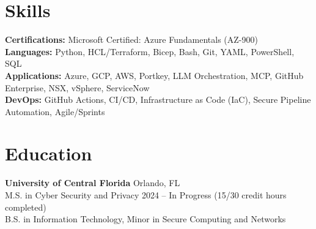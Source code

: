 \documentclass[10pt, letterpaper]{article}
\begin{document}
\section{Skills}
\textbf{Certifications:} Microsoft Certified: Azure Fundamentals (AZ-900) \\
\textbf{Languages:} Python, HCL/Terraform, Bicep, Bash, Git, YAML, PowerShell, SQL \\
\textbf{Applications:} Azure, GCP, AWS, Portkey, LLM Orchestration, MCP, GitHub Enterprise, NSX, vSphere, ServiceNow \\
\textbf{DevOps:} GitHub Actions, CI/CD, Infrastructure as Code (IaC), Secure Pipeline Automation, Agile/Sprints

\section{Education}
\textbf{University of Central Florida} \hfill Orlando, FL \\
M.S. in Cyber Security and Privacy \hfill 2024 -- In Progress (15/30 credit hours completed) \\
B.S. in Information Technology, Minor in Secure Computing and Networks
\end{document}

